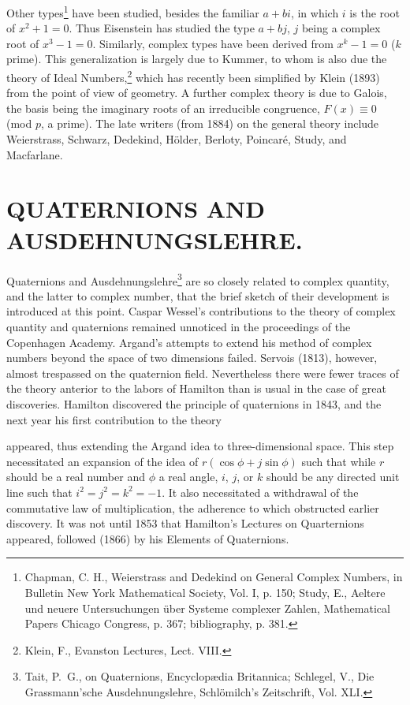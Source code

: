 \documentclass[oneside]{book}
\begin{document}
{Other types\footnote{Chapman, C. H., Weierstrass and Dedekind on
General Complex Numbers, in Bulletin New York Mathematical Society,
Vol. I, p. 150; Study, E., Aeltere und neuere Untersuchungen \"uber
Systeme complexer Zahlen, Mathematical Papers Chicago Congress,
p. 367; bibliography, p. 381.} have been studied, besides the
familiar $a + bi$, in which $i$ is the root of $x^2 + 1 = 0$. Thus
Eisenstein has studied the type $a + bj$, $j$ being a complex root
of $x^3 - 1 = 0$. Similarly, complex types have been derived from
$x^k - 1 = 0$ ($k$ prime). This generalization is largely due to
Kummer, to whom is also due the theory of Ideal
Numbers,\footnote{Klein, F., Evanston Lectures, Lect. VIII.} which
has recently been simplified by Klein (1893) from the point of view
of geometry. A further complex theory is due to Galois, the basis
being the imaginary roots of an irreducible congruence, $F(x) \equiv 0$
(mod $p$, a prime). The late writers (from 1884) on the general
theory include Weierstrass, Schwarz, Dedekind, H\"older, Berloty,
Poincar\'e, Study, and Macfarlane.

\chapter{QUATERNIONS AND AUSDEHNUNGSLEHRE.}

Quaternions and Ausdehnungslehre\footnote{Tait, P.~G., on
Quaternions, Encyclop\ae{}dia Britannica; Schlegel, V., Die
Grassmann'sche Ausdehnungslehre, Schl\"omilch's Zeitschrift,
Vol. XLI.} are so closely related to complex quantity, and the
latter to complex number, that the brief sketch of their development
is introduced at this point. Caspar Wessel's contributions to the
theory of complex quantity and quaternions remained unnoticed in
the proceedings of the Copenhagen Academy. Argand's attempts to
extend his method of complex numbers beyond the space of two
dimensions failed. Servois (1813), however, almost trespassed on the
quaternion field. Nevertheless there were fewer traces of the theory
anterior to the labors of Hamilton than is usual in the case of
great discoveries. Hamilton discovered the principle of quaternions
in 1843, and the next year his first contribution to the theory


appeared, thus extending the Argand idea to three-dimensional
space. This step necessitated an expansion of the idea of $r(\cos
\phi + j \sin \phi)$ such that while $r$ should be a real number and
$\phi$ a real angle, $i$, $j$, or $k$ should be any directed unit
line such that $i^2 = j^2 = k^2 = -1$. It also necessitated a
withdrawal of the commutative law of multiplication, the adherence
to which obstructed earlier discovery. It was not until 1853 that
Hamilton's Lectures on Quarternions appeared, followed (1866) by his
Elements of Quaternions.

}
\end{document}

